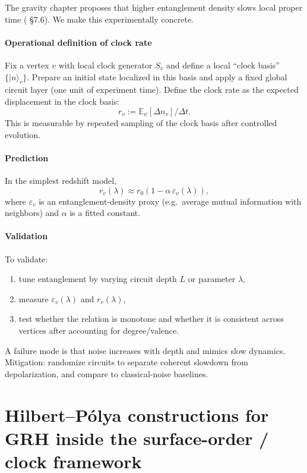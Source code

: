 \documentclass[11pt,oneside]{amsbook}
\numberwithin{equation}{section}
\theoremstyle{plain}
\theoremstyle{definition}
\theoremstyle{remark}
\begin{document}
The  gravity chapter proposes that higher entanglement density slows local proper time ( \S7.6).
We make this experimentally concrete.

\subsubsection{Operational definition of clock rate}
Fix a vertex $v$ with local clock generator $S_v$ and define a local ``clock basis'' $\{|n\rangle_v\}$.
Prepare an initial state localized in this basis and apply a fixed global circuit layer (one unit of experiment time).
Define the clock rate as the expected displacement in the clock basis:
\[
r_v := \mathbb{E}_\psi[\Delta n_v]/\Delta t.
\]
This is measurable by repeated sampling of the clock basis after controlled evolution.

\subsubsection{Prediction}
In the simplest redshift model,
\[
r_v(\lambda) \approx r_0\left(1 - \alpha \,\varepsilon_v(\lambda)\right),
\]
where $\varepsilon_v$ is an entanglement-density proxy (e.g.\ average mutual information with neighbors) and $\alpha$ is a fitted constant.

\subsubsection{Validation}
To validate:
\begin{enumerate}
\item tune entanglement by varying circuit depth $L$ or parameter $\lambda$,
\item measure $\varepsilon_v(\lambda)$ and $r_v(\lambda)$,
\item test whether the relation is monotone and whether it is consistent across vertices after accounting for degree/valence.
\end{enumerate}

A failure mode is that noise increases with depth and mimics slow dynamics.
Mitigation: randomize circuits to separate coherent slowdown from depolarization, and compare to classical-noise baselines.


\chapter{Hilbert--Pólya constructions for GRH inside the surface-order / clock framework}
\label{ch:hilbertpolya}
\end{document}
